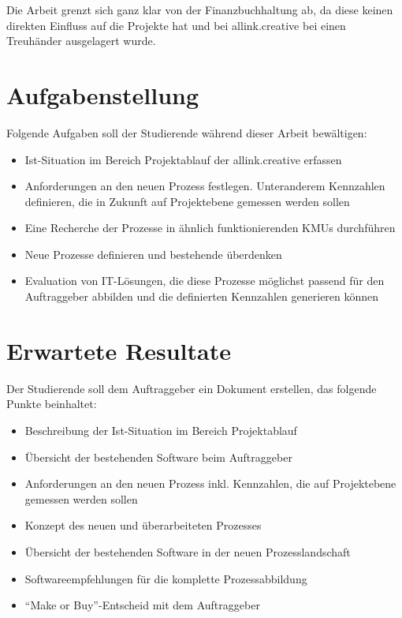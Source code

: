 \documentclass[]{scrreprt}
\begin{document}
    Die Arbeit grenzt sich ganz klar von der Finanzbuchhaltung ab, da
    diese keinen direkten Einfluss auf die Projekte hat und bei allink.creative 
    bei einen Treuhänder ausgelagert wurde.
    

    \section{Aufgabenstellung}
    Folgende Aufgaben soll der Studierende während dieser Arbeit bewältigen:
    
    \begin{itemize}
        \item Ist-Situation im Bereich Projektablauf der allink.creative erfassen
        \item Anforderungen an den neuen Prozess festlegen. Unteranderem Kennzahlen 
            definieren, die in Zukunft auf Projektebene gemessen werden sollen
        \item Eine Recherche der Prozesse in ähnlich funktionierenden KMUs durchführen
        \item Neue Prozesse definieren und bestehende überdenken
        \item Evaluation von IT-Lösungen, die diese Prozesse möglichst passend 
            für den Auftraggeber abbilden und die definierten Kennzahlen generieren können
    \end{itemize}

    \section{Erwartete Resultate}
    Der Studierende soll dem Auftraggeber ein Dokument erstellen, das folgende 
    Punkte beinhaltet: 
    
    \begin{itemize}
        \item Beschreibung der Ist-Situation im Bereich Projektablauf
        \item Übersicht der bestehenden Software beim Auftraggeber
        \item Anforderungen an den neuen Prozess inkl. Kennzahlen, die auf 
            Projektebene gemessen werden sollen
        \item Konzept des neuen und überarbeiteten Prozesses
        \item Übersicht der bestehenden Software in der neuen Prozesslandschaft
        \item Softwareempfehlungen für die komplette Prozessabbildung
        \item ``Make or Buy''-Entscheid mit dem Auftraggeber
    \end{itemize}
    
\end{document}
